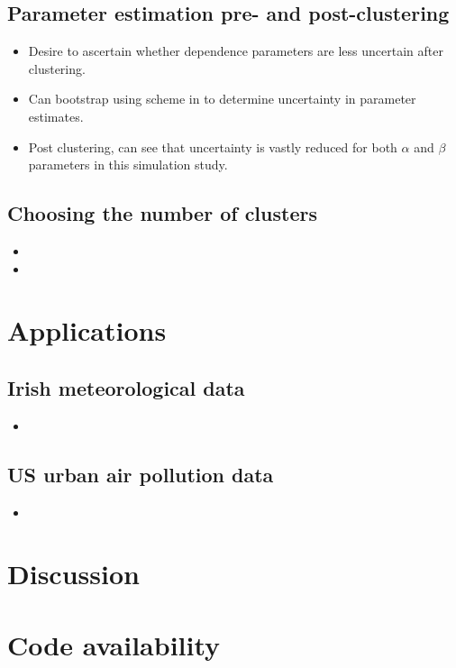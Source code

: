 \documentclass{article}
\numberwithin{equation}{section}
\begin{document}
\subsection{Parameter estimation pre- and post-clustering} \label{subsec:sim_refit}

\begin{itemize}
    \item Desire to ascertain whether dependence parameters are less uncertain after clustering. 
    \item Can bootstrap using scheme in \cite{Heffernan2004} to determine uncertainty in parameter estimates. 
    \item Post clustering, can see that uncertainty is vastly reduced for both $\alpha$ and $\beta$ parameters in this simulation study. 
\end{itemize}

\subsection{Choosing the number of clusters} \label{subsec:sim_n_clust}

\begin{itemize}
    \item {}
    \item {}
\end{itemize}

\section{Applications}
\subsection{Irish meteorological data} \label{subsec:app_irl}

\begin{itemize}
    \item 
\end{itemize}

\subsection{US urban air pollution data} \label{subsec:app_us}

\begin{itemize}
    \item 
\end{itemize}

\section{Discussion}

\section*{Code availability}

\newpage

\end{document}
